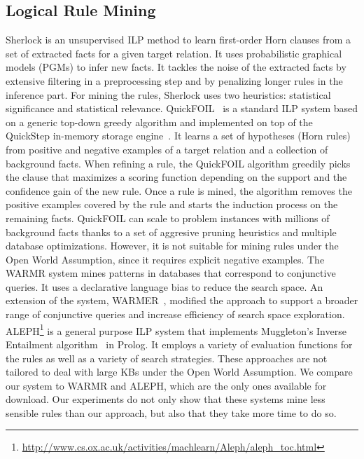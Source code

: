 \subsection{Logical Rule Mining}
Sherlock \cite{SchEtzWel10} is an unsupervised ILP method to learn first-order Horn clauses from a set of extracted facts for a given target relation. 
It uses probabilistic graphical models (PGMs) to infer new facts. 
It tackles the noise of the extracted  facts by extensive filtering in a preprocessing step and by penalizing longer rules in the inference part. 
For mining the rules, Sherlock uses two heuristics: statistical significance and statistical relevance. 
QuickFOIL~\cite{quickfoil} is a standard ILP system based on a generic top-down greedy algorithm and implemented 
on top of  the QuickStep in-memory storage engine~\cite{Chasseur:2013:DES:2536258.2536260}. It learns a set of hypotheses (Horn rules)
from positive and negative examples of a target relation and a collection of background facts. When refining a rule, the QuickFOIL algorithm 
greedily picks the clause that maximizes a scoring 
function depending on the support and the confidence gain of the new rule. Once a rule is mined, the algorithm removes the positive examples
covered by the rule and starts the induction process on the remaining facts.
QuickFOIL can scale to problem  instances with millions of background facts thanks to a 
set of aggresive pruning heuristics and multiple database optimizations. 
However, it is not suitable for mining rules under the Open World Assumption, since it requires explicit negative examples. 
The WARMR system \cite{DehToi99,DehToi00} mines patterns in data\-bases that correspond to conjunctive queries. It uses a declarative language bias to reduce the search space. 
An extension of the system, WARMER~\cite{GoeVan02}, modified the approach to support a broader range of conjunctive queries and increase efficiency of search space exploration. 
ALEPH\footnote{\label{foot:aleph}\url{http://www.cs.ox.ac.uk/activities/machlearn/Aleph/aleph_toc.html}} is a general purpose ILP system that implements Muggleton's Inverse Entailment algorithm~\cite{Muggleton95inverseentailment} in Prolog. 
It employs a variety of evaluation functions for the rules as well as a variety of search strategies. 
These approaches are not tailored to deal with large KBs under the Open World Assumption. 
We compare our system to WARMR and ALEPH, which are the only ones available for download. 
Our experiments do not only show that these systems mine less sensible rules than our approach, but also that they take more time to do so. 

